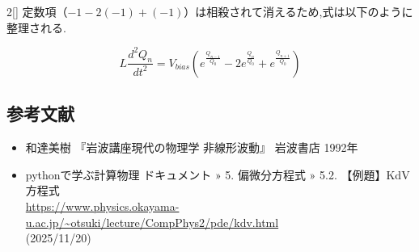 \documentclass[a4paper,10pt]{article}
\begin{document}
\begin{multicols}{2}[\raggedcolumns]
定数項（$-1 - 2(-1) + (-1)$）は相殺されて消えるため,式は以下のように整理される.

\begin{equation}
    L \frac{d^2 Q_n}{dt^2} = V_{bias} \left( e^{\frac{Q_{n-1}}{Q_0}} - 2e^{\frac{Q_n}{Q_0}} + e^{\frac{Q_{n+1}}{Q_0}} \right)
\end{equation}



\subsection{参考文献}
\begin{itemize}
    \item 和達美樹 『岩波講座現代の物理学 非線形波動』 岩波書店 1992年
    \item pythonで学ぶ計算物理 ドキュメント » 5. 偏微分方程式 » 5.2. 【例題】KdV方程式\\ 
    \url{https://www.physics.okayama-u.ac.jp/~otsuki/lecture/CompPhys2/pde/kdv.html}\\
    (2025/11/20)
\end{itemize}

\newpage
\vfill
\end{multicols}
\end{document}
